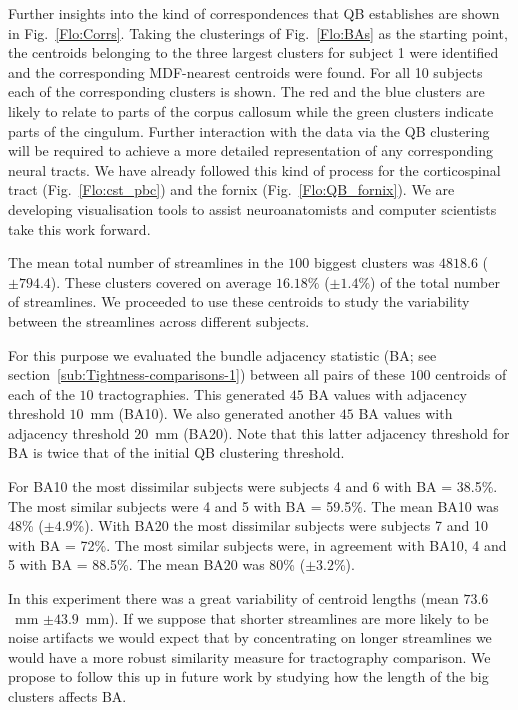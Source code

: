 \documentclass{bioinfo}
\begin{document}
Further insights into the kind of correspondences that QB establishes
are shown in Fig.~\ref{Flo:Corrs}. Taking the clusterings of
Fig.~\ref{Flo:BAs} as the starting point, the centroids belonging to the
three largest clusters for subject 1 were identified and the
corresponding MDF-nearest centroids were found. For all 10 subjects each
of the corresponding clusters is shown. The red and the blue clusters
are likely to relate to parts of the corpus callosum while the green
clusters indicate parts of the cingulum. Further interaction with the
data via the QB clustering will be required to achieve a more detailed
representation of any corresponding neural tracts. We have already
followed this kind of process for the corticospinal tract
(Fig.~\ref{Flo:cst_pbc}) and the fornix (Fig.~\ref{Flo:QB_fornix}). We
are developing visualisation tools to assist neuroanatomists and
computer scientists take this work forward.

The mean total number of streamlines in the $100$ biggest clusters was
$\num{4818.6}$ ($\pm \num{794.4}$). These clusters covered on average
$16.18\%$ ($\pm\num{1.4}\%$) of the total number of streamlines. We
proceeded to use these centroids to study the variability between the
streamlines across different subjects.

For this purpose we evaluated the bundle adjacency statistic (BA; see
section~\ref{sub:Tightness-comparisons-1}) between all pairs of these
$100$ centroids of each of the $10$ tractographies. This generated $45$
BA values with adjacency threshold $10$~mm (BA10). We also generated
another $45$ BA values with adjacency threshold $20$~mm (BA20). Note
that this latter adjacency threshold for BA is twice that of the initial
QB clustering threshold.

For BA10 the most dissimilar subjects were subjects 4 and 6 with BA =
38.5\%. The most similar subjects were 4 and 5 with BA = 59.5\%. The
mean BA10 was 48\% ($\pm\num{4.9}$\%). With BA20 the most dissimilar
subjects were subjects 7 and 10 with BA = 72\%. The most similar
subjects were, in agreement with BA10, 4 and 5 with BA = 88.5\%. The
mean BA20 was 80\% ($\pm\num{3.2}$\%).

In this experiment there was a great variability of centroid lengths
(mean $73.6$~mm $\pm\num{43.9}$~mm). If we suppose that shorter
streamlines are more likely to be noise artifacts we would expect that
by concentrating on longer streamlines we would have a more robust
similarity measure for tractography comparison. We propose to follow
this up in future work by studying how the length of the big clusters
affects BA.
\end{document}
